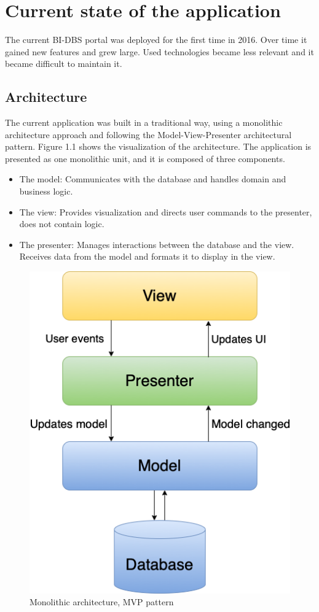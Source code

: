 \section{Current state of the application}
The current BI-DBS portal was deployed for the first time in 2016. Over time it gained new features and grew large. Used technologies became less relevant and it became difficult to maintain it.

\subsection{Architecture}
The current application was built in a traditional way, using a monolithic architecture approach and following the Model-View-Presenter architectural pattern\cite{potel_mvp}. Figure 1.1 shows the visualization of the architecture. The application is presented as one monolithic unit, and it is composed  of three components. 

\begin{itemize}
  \item The model: Communicates with the database and handles domain and business logic.
  \item The view: Provides visualization and directs user commands to the presenter, does not contain logic.
  \item The presenter: Manages interactions between the database and the view. Receives data from the model and formats it to display in the view.
\end{itemize}

\begin{figure}[hp]
\centering
\includegraphics[scale=0.52]{../png/mvp_monolithic.png}
\caption{Monolithic architecture, MVP pattern}\label{picture:mvp}
\end{figure}


